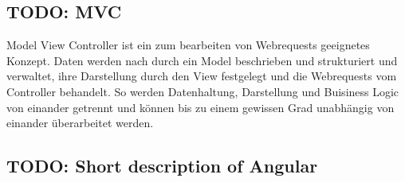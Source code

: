 \subsection{TODO: MVC}
Model View Controller ist ein zum bearbeiten von Webrequests geeignetes Konzept.
Daten werden nach durch ein Model beschrieben und strukturiert und verwaltet, ihre Darstellung
durch den View festgelegt und die Webrequests vom Controller behandelt. So
werden Datenhaltung, Darstellung und Buisiness Logic von einander getrennt und
können bis zu einem gewissen Grad unabhängig von einander
überarbeitet werden.

\subsection{TODO: Short description of Angular}



